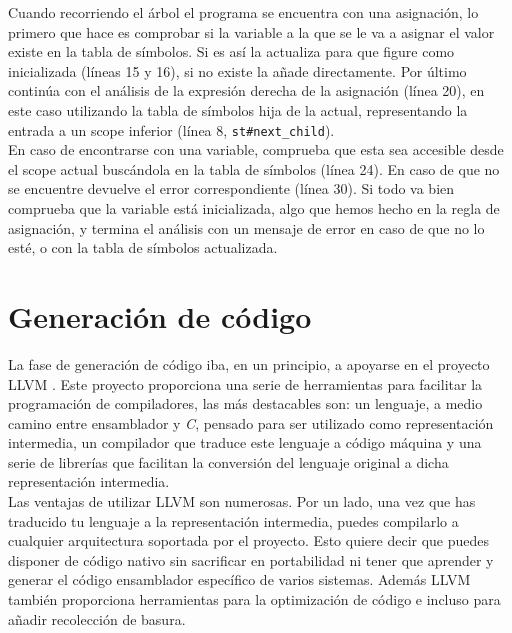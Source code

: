Cuando recorriendo el árbol el programa se encuentra con una asignación, lo primero que hace es comprobar si la variable a la que se le va a asignar el valor existe en la tabla de símbolos. Si es así la actualiza para que figure como inicializada (líneas 15 y 16), si no existe la añade directamente. Por último continúa con el análisis de la expresión derecha de la asignación (línea 20), en este caso utilizando la tabla de símbolos hija de la actual, representando la entrada a un scope inferior (línea 8, \lstinline[style=ocaml]{st#next_child}).\\

En caso de encontrarse con una variable, comprueba que esta sea accesible desde el scope actual buscándola en la tabla de símbolos (línea 24). En caso de que no se encuentre devuelve el error correspondiente (línea 30). Si todo va bien comprueba que la variable está inicializada, algo que hemos hecho en la regla de asignación, y termina el análisis con un mensaje de error en caso de que no lo esté, o con la tabla de símbolos actualizada.\\

\section{Generación de código}
La fase de generación de código iba, en un principio, a apoyarse en el proyecto LLVM \cite{llvm}. Este proyecto proporciona una serie de herramientas para facilitar la programación de compiladores, las más destacables son: un lenguaje, a medio camino entre ensamblador y \textit{C}, pensado para ser utilizado como representación intermedia, un compilador que traduce este lenguaje a código máquina y una serie de librerías que facilitan la conversión del lenguaje original a dicha representación intermedia.\\

Las ventajas de utilizar LLVM son numerosas. Por un lado, una vez que has traducido tu lenguaje a la representación intermedia, puedes compilarlo a cualquier arquitectura soportada por el proyecto. Esto quiere decir que puedes disponer de código nativo sin sacrificar en portabilidad ni tener que aprender y generar el código ensamblador específico de varios sistemas. Además LLVM también proporciona herramientas para la optimización de código e incluso para añadir recolección de basura.\\


